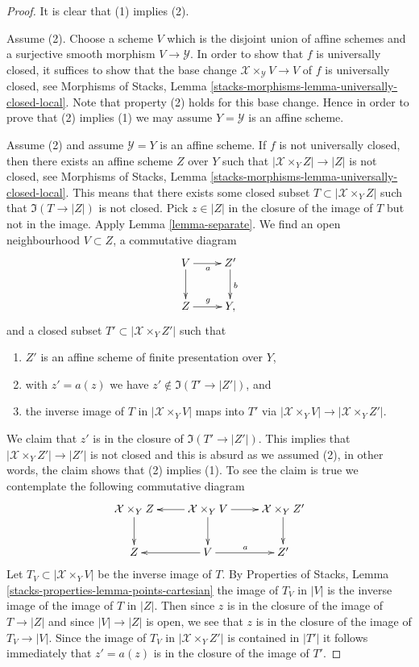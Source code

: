 \begin{proof}
It is clear that (1) implies (2).

\medskip\noindent
Assume (2). Choose a scheme $V$ which is the disjoint union of
affine schemes and a surjective smooth morphism $V \to \mathcal{Y}$.
In order to show that $f$ is universally closed, it suffices to show
that the base change $\mathcal{X} \times_\mathcal{Y} V \to V$ of $f$
is universally closed, see Morphisms of Stacks, Lemma
\ref{stacks-morphisms-lemma-universally-closed-local}.
Note that property (2) holds for this base change.
Hence in order to prove  that (2) implies (1) we may assume
$Y = \mathcal{Y}$ is an affine scheme.

\medskip\noindent
Assume (2) and assume $\mathcal{Y} = Y$ is an affine scheme.
If $f$ is not universally closed, then there exists an affine
scheme $Z$ over $Y$ such that $|\mathcal{X} \times_Y Z| \to |Z|$
is not closed, see Morphisms of Stacks, Lemma
\ref{stacks-morphisms-lemma-universally-closed-local}.
This means that there exists some closed subset
$T \subset |\mathcal{X} \times_Y Z|$
such that $\Im(T \to |Z|)$ is not closed. Pick $z \in |Z|$
in the closure of the image of $T$ but not in the image.
Apply Lemma \ref{lemma-separate}.
We find an open neighbourhood $V \subset Z$, a commutative diagram
$$
\xymatrix{
V \ar[d] \ar[r]_a & Z' \ar[d]^b \\
Z \ar[r]^g & Y,
}
$$
and a closed subset $T' \subset |\mathcal{X} \times_Y Z'|$ such that
\begin{enumerate}
\item $Z'$ is an affine scheme of finite presentation over $Y$,
\item with $z' = a(z)$ we have $z' \not \in \Im(T' \to |Z'|)$, and
\item the inverse image of $T$ in $|\mathcal{X} \times_Y V|$ maps into $T'$ via
$|\mathcal{X} \times_Y V| \to |\mathcal{X} \times_Y Z'|$.
\end{enumerate}
We claim that $z'$ is in the closure of $\Im(T' \to |Z'|)$.
This implies that $|\mathcal{X} \times_Y Z'| \to |Z'|$ is not closed
and this is absurd as we assumed (2), in other words,
the claim shows that (2) implies (1).
To see the claim is true we contemplate the
following commutative diagram
$$
\xymatrix{
\mathcal{X} \times_Y Z \ar[d] &
\mathcal{X} \times_Y V \ar[l] \ar[d] \ar[r] &
\mathcal{X} \times_Y Z' \ar[d] \\
Z & V \ar[l] \ar[r]^a & Z'
}
$$
Let $T_V \subset |\mathcal{X} \times_Y V|$ be the inverse image of $T$.
By Properties of Stacks, Lemma \ref{stacks-properties-lemma-points-cartesian}
the image of $T_V$ in $|V|$ is the inverse image of the image
of $T$ in $|Z|$. Then since $z$ is in the closure of the image of
$T \to |Z|$ and since $|V| \to |Z|$ is open, we see that $z$ is in
the closure of the image of $T_V \to |V|$. Since the image of
$T_V$ in $|\mathcal{X} \times_Y Z'|$ is contained in $|T'|$ it follows
immediately that $z' = a(z)$ is in the closure of the image of $T'$.


\end{proof}
